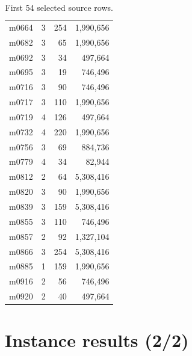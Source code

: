 \documentclass[10pt,a4paper]{article}
\begin{document}
\begin{table}[h!]
\begin{tabular}{lrrr}
m0664 & 3 & 254 & 1,990,656\\
m0682 & 3 & 65 & 1,990,656\\
m0692 & 3 & 34 & 497,664\\
m0695 & 3 & 19 & 746,496\\
m0716 & 3 & 90 & 746,496\\
m0717 & 3 & 110 & 1,990,656\\
m0719 & 4 & 126 & 497,664\\
m0732 & 4 & 220 & 1,990,656\\
m0756 & 3 & 69 & 884,736\\
m0779 & 4 & 34 & 82,944\\
m0812 & 2 & 64 & 5,308,416\\
m0820 & 3 & 90 & 1,990,656\\
m0839 & 3 & 159 & 5,308,416\\
m0855 & 3 & 110 & 746,496\\
m0857 & 2 & 92 & 1,327,104\\
m0866 & 3 & 254 & 5,308,416\\
m0885 & 1 & 159 & 1,990,656\\
m0916 & 2 & 56 & 746,496\\
m0920 & 2 & 40 & 497,664\\
\bottomrule\end{tabular}\caption{First 54 selected source rows.}\label{tab:first}\end{table}
\newpage\section*{Instance results (2/2)}
\end{document}
